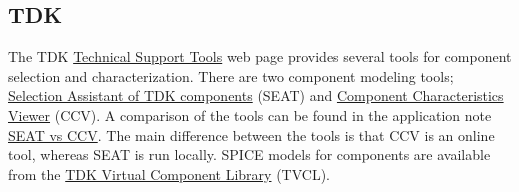 \documentclass[10pt,twoside]{article}
\begin{document}
\clearpage
\subsection{TDK}

The TDK \href{http://www.tdk.com/design-tools.php}
{Technical Support Tools} web page provides several tools for
component selection and characterization.
There are two component modeling tools; 
\href{http://www.tdk.com/seat.php}
{Selection Assistant of TDK components} (SEAT) and 
\href{http://www.tdk.co.jp/ccv/index.asp}
{Component Characteristics Viewer} (CCV). 
%
A comparison of the tools can be found in the application note
\href{http://www.tdk.com/pdf/SEATs_vs_CCV.pdf}{SEAT vs CCV}.
The main difference between the tools is that CCV is an online tool,
whereas SEAT is run locally.
%
SPICE models for components are available from the
\href{http://www.tdk.com/tvcl.php}{TDK Virtual Component Library} (TVCL).
\end{document}

